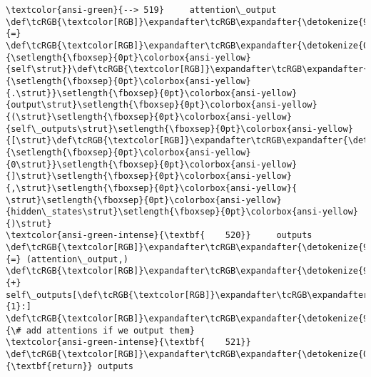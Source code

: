 \documentclass[11pt]{article}
\begin{document}
\begin{Verbatim}[commandchars=\\\{\}, frame=single, framerule=2mm, rulecolor=\color{outerrorbackground}]
\textcolor{ansi-green}{--> 519}     attention\_output \def\tcRGB{\textcolor[RGB]}\expandafter\tcRGB\expandafter{\detokenize{98,98,98}}{=} \def\tcRGB{\textcolor[RGB]}\expandafter\tcRGB\expandafter{\detokenize{0,135,0}}{\setlength{\fboxsep}{0pt}\colorbox{ansi-yellow}{self\strut}}\def\tcRGB{\textcolor[RGB]}\expandafter\tcRGB\expandafter{\detokenize{98,98,98}}{\setlength{\fboxsep}{0pt}\colorbox{ansi-yellow}{.\strut}}\setlength{\fboxsep}{0pt}\colorbox{ansi-yellow}{output\strut}\setlength{\fboxsep}{0pt}\colorbox{ansi-yellow}{(\strut}\setlength{\fboxsep}{0pt}\colorbox{ansi-yellow}{self\_outputs\strut}\setlength{\fboxsep}{0pt}\colorbox{ansi-yellow}{[\strut}\def\tcRGB{\textcolor[RGB]}\expandafter\tcRGB\expandafter{\detokenize{98,98,98}}{\setlength{\fboxsep}{0pt}\colorbox{ansi-yellow}{0\strut}}\setlength{\fboxsep}{0pt}\colorbox{ansi-yellow}{]\strut}\setlength{\fboxsep}{0pt}\colorbox{ansi-yellow}{,\strut}\setlength{\fboxsep}{0pt}\colorbox{ansi-yellow}{ \strut}\setlength{\fboxsep}{0pt}\colorbox{ansi-yellow}{hidden\_states\strut}\setlength{\fboxsep}{0pt}\colorbox{ansi-yellow}{)\strut}
\textcolor{ansi-green-intense}{\textbf{    520}}     outputs \def\tcRGB{\textcolor[RGB]}\expandafter\tcRGB\expandafter{\detokenize{98,98,98}}{=} (attention\_output,) \def\tcRGB{\textcolor[RGB]}\expandafter\tcRGB\expandafter{\detokenize{98,98,98}}{+} self\_outputs[\def\tcRGB{\textcolor[RGB]}\expandafter\tcRGB\expandafter{\detokenize{98,98,98}}{1}:]  \def\tcRGB{\textcolor[RGB]}\expandafter\tcRGB\expandafter{\detokenize{95,135,135}}{\# add attentions if we output them}
\textcolor{ansi-green-intense}{\textbf{    521}}     \def\tcRGB{\textcolor[RGB]}\expandafter\tcRGB\expandafter{\detokenize{0,135,0}}{\textbf{return}} outputs


\end{Verbatim}
\end{document}

